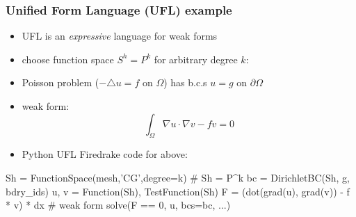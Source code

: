 \documentclass[hide notes,intlimits,usenames,dvipsnames]{beamer}
\newcommand{\grad}{\nabla}
\begin{document}
\begin{frame}[fragile]
\frametitle{Unified Form Language (UFL) example}

\begin{itemize}
\item UFL is an \emph{expressive} language for weak forms
\item choose function space $S^h = P^k$ for arbitrary degree $k$:

\smallskip
\hfill 
\item Poisson problem ($-\triangle u = f$ on $\Omega$) has b.c.s $u=g$ on $\partial\Omega$
\item weak form:
    $$\int_\Omega \grad u \cdot \grad v - f v = 0$$
\item Python UFL Firedrake code for above:
\end{itemize}
\begin{code}
Sh = FunctionSpace(mesh,'CG',degree=k)      # Sh = P^k
bc = DirichletBC(Sh, g, bdry_ids)
u, v = Function(Sh), TestFunction(Sh)
F = (dot(grad(u), grad(v)) - f * v) * dx    # weak form
solve(F == 0, u, bcs=bc, ...)
\end{code}
\end{frame}
\end{document}

